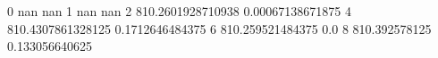 0 nan nan
1 nan nan
2 810.2601928710938 0.00067138671875
4 810.4307861328125 0.1712646484375
6 810.259521484375 0.0
8 810.392578125 0.133056640625
